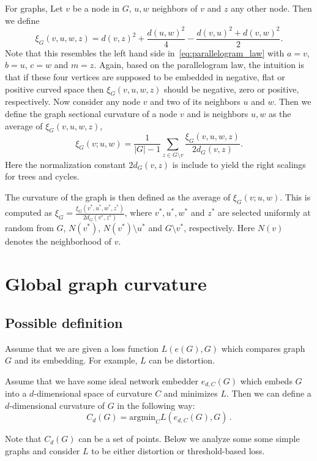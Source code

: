 \documentclass{article}
\begin{document}
For graphs, Let $v$ be a node in $G$, $u,w$ neighbors of $v$ and $z$ any other node. Then we define
\begin{equation}
	\xi_G(v,u,w,z) = d(v,z)^2 + \frac{d(u,w)^2}{4} - \frac{d(v,u)^2 + d(v,w)^2}{2}.
\end{equation}
Note that this resembles the left hand side in~\eqref{eq:parallelogram_law} with $a = v$, $b = u$, $c = w$ and $m = z$. Again, based on the parallelogram law, the intuition is that if these four vertices are supposed to be embedded in negative, flat or positive curved space then $\xi_G(v,u,w,z)$ should be negative, zero or positive, respectively. Now consider any node $v$ and two of its neighbors $u$ and $w$. Then we define the graph sectional curvature of a node $v$ and is neighbors $u,w$ as the average of $\xi_G(v,u,w,z)$,
\[
	\xi_G(v; u,w) = \frac{1}{|G|-1} \sum_{z \in G\setminus v} \frac{\xi_G(v,u,w,z)}{2d_G(v,z)}.
\] 
Here the normalization constant $2d_G(v,z)$ is include to yield the right scalings for trees and cycles.

The curvature of the graph is then defined as the average of $\xi_G(v; u,w)$. This is computed as $\xi_G = \frac{\xi_G(v^\ast,u^\ast,w^\ast,z^\ast)}{2d_G(v^\ast,z^\ast)}$, where $v^\ast, u^\ast, w^\ast$ and $z^\ast$ are selected uniformly at random from $G$, $N(v^\ast)$, $N(v^\ast)\setminus u^\ast$ and $G\setminus v^\ast$, respectively. Here $N(v)$ denotes the neighborhood of $v$.



\section{Global graph curvature}

\subsection{Possible definition}
        
Assume that we are given a loss function $L(e(G),G)$ which compares graph $G$ and its embedding. For example, $L$ can be distortion.

Assume that we have some ideal network embedder $e_{d,C}(G)$ which embeds $G$ into a $d$-dimensional space of curvature $C$ and minimizes $L$. Then we can define a $d$-dimensional curvature of $G$ in the following way:
\[
C_d(G) = \textrm{argmin}_C L(e_{d,C}(G),G)\,.
\]

Note that $C_d(G)$ can be a set of points. Below we analyze some some simple graphs and consider $L$ to be either distortion or threshold-based loss.
\end{document}
